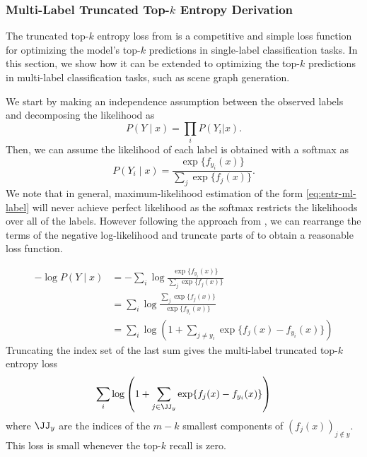 \subsubsection{Multi-Label Truncated Top-$k$ Entropy Derivation}
\label{sec:lml:entr-ml-derivation}

The truncated top-$k$ entropy loss from \citet{lapin2016loss}
is a competitive and simple loss function for optimizing
the model's top-$k$ predictions in single-label classification tasks.
In this section, we show how it can be extended to optimizing
the top-$k$ predictions in multi-label classification tasks,
such as scene graph generation.

We start by making an independence assumption between the
observed labels and decomposing the likelihood as
\begin{equation}
  P(Y\mid x)=\prod_i P(Y_i | x).
\end{equation}
Then, we can assume the likelihood of each label is
obtained with a softmax as
\begin{equation}
  \label{eq:entr-ml-label}
  P(Y_i\mid x)=\frac{\exp\{f_{y_i}(x)\}}{\sum_j \exp\{f_j(x)\}}.
\end{equation}
We note that in general, maximum-likelihood estimation
of the form \cref{eq:entr-ml-label} will never achieve
perfect likelihood as the softmax restricts the
likelihoods over all of the labels.
However following the approach from \citet{lapin2016loss},
we can rearrange the terms of the negative log-likelihood
and truncate parts of to obtain a reasonable loss function.

\begin{equation}
  \begin{split}
    -\log P(Y\mid x) &= -\sum_i \log \frac{\exp\{f_{y_i}(x)\}}{\sum_j \exp\{f_j(x)\}} \\
    &= \sum_i \log\frac{\sum_j \exp\{f_j(x)\}}{\exp\{f_{y_i}(x)\}} \\
    &= \sum_i \log \left( 1 + \sum_{j\neq y_i} \exp\{f_j(x)-f_{y_i}(x)\} \right)
  \end{split}
\end{equation}
Truncating the index set of the last sum gives the multi-label
truncated top-$k$ entropy loss
\begin{equation}
  \sum_i \log \left( 1 + \sum_{j\in \JJ_y} \exp\{f_j(x)-f_{y_i}(x)\} \right)
\end{equation}
where $\JJ_y$ are the indices of the $m-k$ smallest
components of $\left(f_j(x)\right)_{j\not\in y}$.
This loss is small whenever the top-$k$ recall
is zero.


